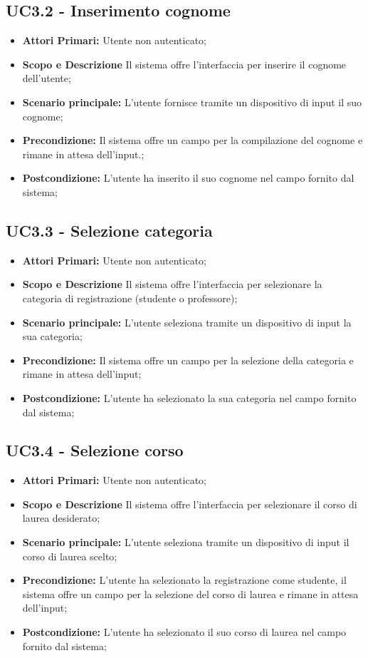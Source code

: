 \documentclass[AnalisiDeiRequisiti.tex]{subfiles}
\begin{document}
\subsection{UC3.2 - Inserimento cognome}
\begin{itemize}
	\item \textbf{Attori Primari:} Utente non autenticato;
	\item \textbf{Scopo e Descrizione} Il sistema offre l'interfaccia per inserire il cognome dell'utente;
	\item \textbf{Scenario principale:} L'utente fornisce tramite un dispositivo di input il suo cognome;
	\item \textbf{Precondizione:} Il sistema offre un campo per la compilazione del cognome e rimane in attesa dell'input.;
	\item \textbf{Postcondizione:} L'utente ha inserito il suo cognome nel campo fornito dal sistema;
\end{itemize}
\subsection{UC3.3 - Selezione categoria}
\begin{itemize}
	\item \textbf{Attori Primari:} Utente non autenticato;
	\item \textbf{Scopo e Descrizione} Il sistema offre l'interfaccia per selezionare la categoria di registrazione (studente o professore);
	\item \textbf{Scenario principale:} L'utente seleziona tramite un dispositivo di input la sua categoria;
	\item \textbf{Precondizione:} Il sistema offre un campo per la selezione della categoria e rimane in attesa dell'input;
	\item \textbf{Postcondizione:} L'utente ha selezionato la sua categoria nel campo fornito dal sistema;
\end{itemize}
\subsection{UC3.4 - Selezione corso}
\begin{itemize}
	\item \textbf{Attori Primari:} Utente non autenticato;
	\item \textbf{Scopo e Descrizione} Il sistema offre l'interfaccia per selezionare il corso di laurea desiderato;
	\item \textbf{Scenario principale:} L'utente seleziona tramite un dispositivo di input il corso di laurea scelto;
	\item \textbf{Precondizione:} L'utente ha selezionato la registrazione come studente, il sistema offre un campo per la selezione del corso di laurea e rimane in attesa dell'input;
	\item \textbf{Postcondizione:} L'utente ha selezionato il suo corso di laurea nel campo fornito dal sistema;
\end{itemize}
\end{document}
